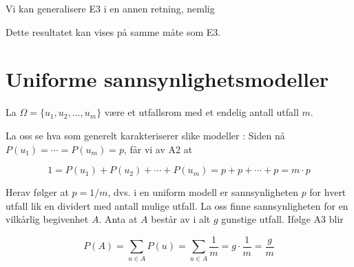 \noindent Vi kan generalisere E3 i en annen retning, nemlig \\
\begin{center}  \end{center}  

\noindent Dette resultatet kan vises på samme måte som E3.


\section{Uniforme sannsynlighetsmodeller}

La $\Omega = \{u_1, u_2, \ldots, u_m \}$ være et utfallsrom med
et endelig antall utfall $m$. \\
\begin{center}  \end{center}
\noindent La oss se hva som generelt karakteriserer slike modeller : Siden
nå $P(u_1) = \cdots = P(u_m) = p$, får vi av A2 at

\[ 1 = P(u_1) + P(u_2) + \cdots + P(u_m) = p+p+ \cdots +p = m \cdot p \]

\noindent Herav følger at $p = 1/m$, dvs. i en uniform modell er
sannsynligheten $p$ for hvert utfall lik en dividert med antall
mulige utfall. La oss finne sannsynligheten for en vilkårlig
begivenhet $A$. Anta at $A$ består av i alt $g$ gunstige utfall. Ifølge
A3 blir

\[     P(A)=\sum_{u \in A}P(u)=\sum_{u \in A}\frac{1}{m}=
                     g \cdot \frac{1}{m}= \frac{g}{m} \]

